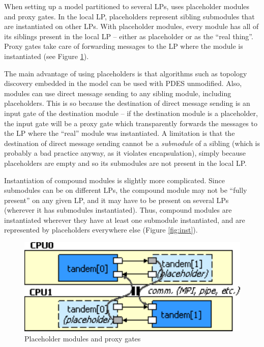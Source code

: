 When setting up a model partitioned to several LPs,
{\opp} uses placeholder modules and proxy gates.
In the local LP, placeholders represent sibling submodules
that are instantiated on other LPs.
With placeholder modules, every module has all of its siblings
present in the local LP -- either as placeholder or as the ``real thing''.
Proxy gates take care of forwarding messages to the LP where
the module is instantiated (see Figure \ref{fig:plach}).

The main advantage of using placeholders is that algorithms such as
topology discovery embedded in the model can be used with PDES unmodified.
Also, modules can use direct message sending to any sibling module,
including placeholders. This is so because the destination of direct message
sending is an input gate of the destination module -- if the destination
module is a placeholder, the input gate will be a proxy gate which
transparently forwards the messages to the LP where the ``real'' module
was instantiated. A limitation is that the destination of direct message
sending cannot be a \textit{submodule} of a sibling (which is
probably a bad practice anyway, as it violates encapsulation),
simply because placeholders are empty and so its submodules are
not present in the local LP.

Instantiation of compound modules is slightly more complicated.
Since submodules can be on different LPs, the compound module may
not be ``fully present'' on any given LP, and it may have to be
present on several LPs (wherever it has submodules instantiated).
Thus, compound modules are instantiated wherever they have
at least one submodule instantiated, and are represented by placeholders
everywhere else (Figure \ref{fig:inst}).


\begin{figure}[htbp]
  \begin{center}
    \includegraphics{figures/placeholders}
    \caption{Placeholder modules and proxy gates}
    \label{fig:plach}
  \end{center}
\end{figure}

